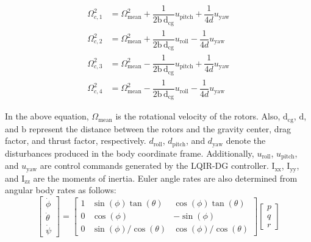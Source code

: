 \documentclass[3p]{elsarticle}
\begin{document}
 \begin{align}
    \Omega_{c, 1}^2 &= \Omega_{\text{mean}}^2 + \dfrac{1}{2\mathrm{b\,d}_{\text{cg}}}u_{\text{pitch}} + \dfrac{1}{4d}u_{\text{yaw}} \\
    \Omega_{c, 2}^2 &= \Omega_{\text{mean}}^2 + \dfrac{1}{2\mathrm{b\,d}_{\text{cg}}}u_{\text{roll}} - \dfrac{1}{4d}u_{\text{yaw}}\\
    \Omega_{c, 3}^2 &= \Omega_{\text{mean}}^2 - \dfrac{1}{2\mathrm{b\,d}_{\text{cg}}}u_{\text{pitch}} + \dfrac{1}{4d}u_{\text{yaw}} \\
    \Omega_{c, 4}^2 &= \Omega_{\text{mean}}^2 - \dfrac{1}{2\mathrm{b\,d}_{\text{cg}}}u_{\text{roll}} - \dfrac{1}{4d}u_{\text{yaw}}
\end{align}

In the above equation, $\Omega_{\text{mean}}$ is the rotational velocity of the rotors. Also, $\mathrm{d}_{\text{cg}}$, $\text{d}$, and $\text{b}$ represent the distance between the rotors and the gravity center, drag factor, and thrust factor, respectively.
$d_{\text{roll}}$, $d_{\text{pitch}}$, and $d_{\text{yaw}}$ denote the disturbances produced in the body coordinate frame. Additionally,
$u_{\text{roll}}$, $u_{\text{pitch}}$, and $u_{\text{yaw}}$ are control commands generated by the LQIR-DG controller.
 $\mathrm{I}_{\text{xx}}$, $\mathrm{I}_{\text{yy}}$, and $\mathrm{I}_{\text{zz}}$ are the moments of inertia.
Euler angle rates are also determined from angular body rates as follows:
\begin{equation}
    \begin{bmatrix}
    \dot\phi \\
    \dot\theta \\
    \dot\psi
    \end{bmatrix} = 
    \begin{bmatrix}
    1 & \sin(\phi)\tan(\theta) & \cos(\phi)\tan(\theta) \\
    0 & \cos(\phi) & -\sin(\phi) \\
    0 & \sin(\phi)/\cos(\theta) & \cos(\phi)/\cos(\theta)
    \end{bmatrix}
    \begin{bmatrix}
    p \\
    q \\
    r
    \end{bmatrix}
\end{equation}
\end{document}
